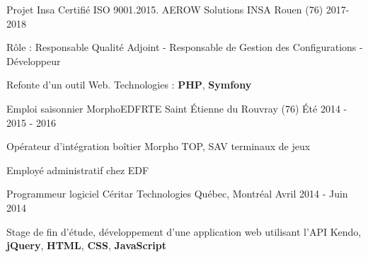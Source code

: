 

\begin{cventries}

  \cventry
	{Projet Insa Certifié ISO 9001.2015.} %
	{AEROW Solutions} %
	{INSA Rouen (76)} %
	{2017-2018} %
	{
		\begin{cvitems} %
			\item {Rôle : Responsable Qualité Adjoint - Responsable de Gestion des Configurations - Développeur}
			\item {Refonte d'un outil Web. Technologies : \textbf{PHP}, \textbf{Symfony}}
		\end{cvitems}
	}
	
	
	\cventry
	{Emploi saisonnier} %
	{Morpho{\enskip\cdotp\enskip}EDF{\enskip\cdotp\enskip}RTE} %
	{Saint Étienne du Rouvray (76)} %
	{Été 2014 - 2015 - 2016} %
	{
		\begin{cvitems} %
			\item {Opérateur d'intégration boîtier Morpho TOP, SAV terminaux de jeux }
			\item {Employé administratif chez EDF}
		\end{cvitems}
	}


  \cventry
    {Programmeur logiciel} %
    {Céritar Technologies} %
    {Québec, Montréal} %
    {Avril 2014 - Juin 2014} %
    {
      \begin{cvitems} %
        \item {Stage de fin d'étude, développement d'une application web utilisant l'API Kendo, \textbf{jQuery}, \textbf{HTML}, \textbf{CSS}, \textbf{JavaScript}}
      \end{cvitems}
    }

\end{cventries}
